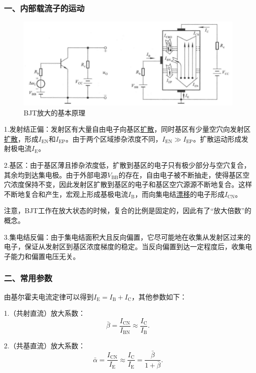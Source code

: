\subsubsection{一、内部载流子的运动}
\begin{figure}[htb]
	\centering
	\includegraphics[width=0.8\linewidth]{pic/BJT原理.png}
	\caption{BJT放大的基本原理\cite{华成英}\label{BJT放大}}
\end{figure}

1.发射结正偏：发射区有大量自由电子向基区\underline{扩散}，同时基区有少量空穴向发射区\underline{扩散}，形成$I_{\mathrm{EN}}$和$I_{\mathrm{EP}}$。由于两个区域掺杂浓度不同，$I_{\mathrm{EN}}\gg I_{\mathrm{EP}}$。扩散运动形成发射极电流$I_{\mathrm{E}}$。

2.基区：由于基区薄且掺杂浓度低，扩散到基区的电子只有极少部分与空穴复合，其余均到达集电极。由于外部电源$V_{\mathrm{BB}}$的存在，自由电子被不断抽走，使得基区空穴浓度保持不变，因此发射区扩散到基区的电子和基区空穴源源不断地复合。这样不断地复合和产生，宏观上形成基极电流$I_{\mathrm{B}}$，而向集电结\underline{漂移}的电子形成$I_{\mathrm{CN}}$。

注意，BJT工作在放大状态的时候，复合的比例是固定的，因此有了“放大倍数”的概念。

3.集电结反偏：由于集电结面积大且反向偏置，它尽可能地在收集从发射区过来的电子，保证从发射区到基区浓度梯度的稳定。当反向偏置到达一定程度后，收集电子能力和偏置电压无关。

\subsubsection{二、常用参数}
由基尔霍夫电流定律可以得到$I_{\mathrm{E}}=I_{\mathrm{B}}+I_{\mathrm{C}}$，其他参数如下：

1.（共射直流）放大系数：
\begin{equation}
    \bar{\beta}=\frac{I_{\mathrm{CN}}}{I_{\mathrm{BN}}}\approx\frac{I_{\mathrm{C}}}{I_{\mathrm{B}}}.
\end{equation}

2.（共基直流）放大系数：
\begin{equation}
    \bar{\alpha}=\frac{I_{\mathrm{CN}}}{I_{\mathrm{E}}}\approx\frac{I_{\mathrm{C}}}{I_{\mathrm{E}}}=\frac{\bar{\beta}}{1+\bar{\beta}}.
\end{equation}

